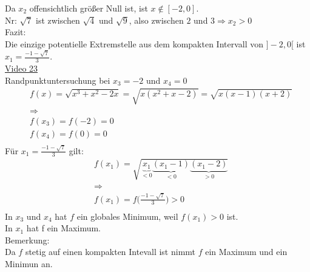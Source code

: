 Da $ x_2 $ offensichtlich größer Null ist, ist $ x\notin [-2,0] $.\\Nr: $ \sqrt{7} $ ist zwischen $ \sqrt{4} $ und $\sqrt{9}$, also zwischen $ 2 $ und $ 3 \Rightarrow x_2>0 $\\
Fazit:\\
Die einzige potentielle Extremstelle aus dem kompakten Intervall von  $ ]-2,0[  $ ist  $x_1=\frac{-1- \sqrt{7}}{3}  $.\\
\href{https://youtu.be/RrEGA0egEKQ}{Video 23}\\
Randpunktuntersuchung bei $ x_3=-2 $ und $ x_4=0$\\
\begin{align*}
&f(x)=\sqrt{x^3+x^2-2x}=\sqrt{x(x^2+x-2)}=\sqrt{x(x-1)(x+2)}\\
&\Rightarrow\\
&f(x_3)=f(-2)=0\\
&f(x_4)=f(0)=0\\
\end{align*}
Für $ x_1=\frac{-1-\sqrt{7}}{3} $ gilt:\\
\begin{align*}
&f(x_1)=\sqrt{\underbrace {x_1}_{<0}\underbrace {(x_1-1)}_{<0}\underbrace {(x_1-2)}_{>0}}\\
&\Rightarrow\\
&f(x_1)=f\bigg(\frac{-1-\sqrt{7}}{3}\bigg)>0\\
\end{align*}
In $ x_3 $ und $ x_4 $ hat $ f $ ein globales Minimum, weil $ f(x_1)>0 $ ist.\\
In $ x_1 $ hat f ein Maximum.\\
\newpage
\noindent
Bemerkung:\\
Da $ f $ stetig auf einen kompakten Intevall ist nimmt  $ f $ ein Maximum und ein Minimun an.\\

